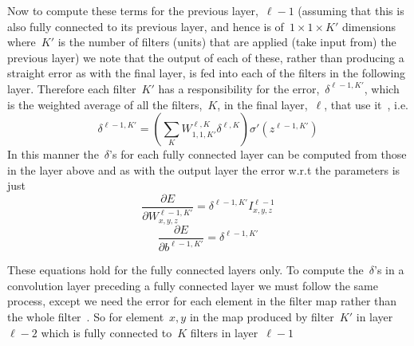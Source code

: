 \documentclass[11pt]{article} %
\begin{document}
Now to compute these terms for the previous layer,~$\ell-1$ (assuming that this is also fully connected to its previous layer, and hence is of~$1 \times 1 \times K'$ dimensions where~$K'$ is the number of filters (units) that are applied (take input from) the previous layer) we note that the output of each of these, rather than producing a straight error as with the final layer, is fed into each of the filters in the following layer. Therefore each filter~$K'$ has a responsibility for the error,~$\delta^{\ell-1,K'}$, which is the weighted average of all the filters,~$K$, in the final layer,~$\ell$, that use it~\cite{Mitchell1997}, i.e. 
\begin{equation}
\delta^{\ell-1,K'}=(\sum_K  W^{\ell,K}_{1,1,K'}\delta^{\ell,K})\sigma'(z^{\ell-1,K'})
\end{equation}
In this manner the~$\delta$'s for each fully connected layer can be computed from those in the layer above and as with the output layer the error w.r.t the parameters is just 
\begin{equation}
\frac{\partial E}{\partial W^{\ell-1,K'}_{x,y,z}}=\delta^{\ell-1,K'}I^{\ell-1}_{x,y,z}
\end{equation}
\begin{equation}
\frac{\partial E}{\partial b^{\ell-1,K'}}=\delta^{\ell-1,K'}
\end{equation}


These equations hold for the fully connected layers only. To compute the~$\delta$'s in a convolution layer preceding a fully connected layer we must follow the same process, except we need the error for each element in the filter map rather than the whole filter~\cite{UFLDL}. %
So for element~$x, y$ in the map produced by filter~$K'$ in layer~$\ell-2$ which is fully connected to~$K$ filters in layer~$\ell-1$~\cite{gibiansky}
\end{document}
